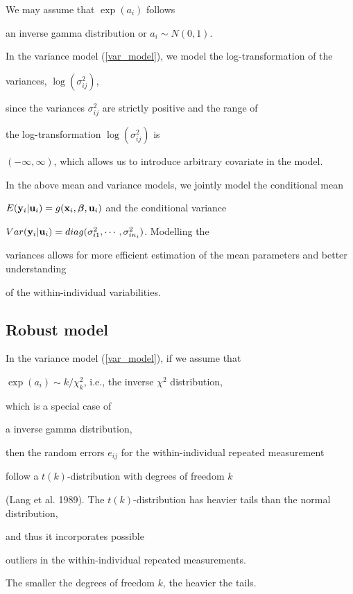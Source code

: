 \documentclass[12pt]{article}
\newcommand{\bbeta}{\mbox{\boldmath $\beta$}}
\begin{document}
We may assume that $\exp(a_i)$ follows 

an inverse gamma distribution or $a_i \sim N(0, 1)$. 

In the variance model (\ref{var_model}), we model the log-transformation of the 

variances, $\log(\sigma_{ij}^2)$, 

since the variances $\sigma_{ij}^2$ are strictly positive and the range of 

the log-transformation $\log(\sigma_{ij}^2)$ is 

$(-\infty, \infty)$, which allows us to introduce arbitrary covariate in the model. 



  In the above mean and variance models, we jointly model the conditional mean

$E({\bf y}_i | {\bf u}_i) = g({\bf x}_i, \bbeta, {\bf u}_i)$ and the conditional variance

$Var({\bf y}_i | {\bf u}_i) = diag(\sigma_{i1}^2, \cdots, \sigma_{in_i}^2)$. Modelling the

variances allows for more efficient estimation of the mean parameters and better understanding

of the within-individual variabilities.



\subsection{Robust model}



    In the variance model (\ref{var_model}), if we assume that 

$ \exp(a_i) \sim k/\chi^2_k$, i.e., the inverse $\chi^2$ distribution, 

which is a special case of 

a inverse gamma distribution, 

  then the random errors $e_{ij}$ for the within-individual repeated measurement 

follow  a $t(k)$-distribution with degrees of freedom $k$ 

(Lang et al. 1989). The $t(k)$-distribution has heavier tails than the normal distribution,

 and thus it incorporates possible 

outliers in the within-individual repeated measurements. 

The smaller the degrees of freedom $k$, the heavier the tails. 
\end{document}
